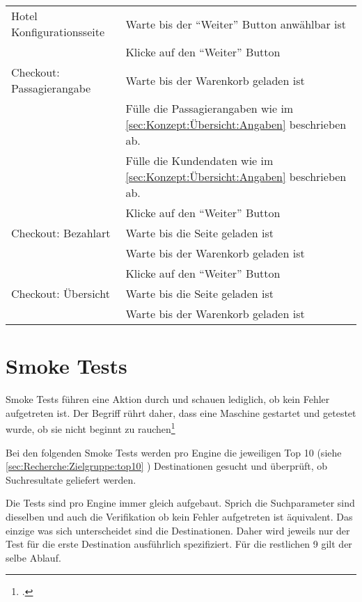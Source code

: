 \begin{table}[H]
\begin{tabularx}{0.9\textwidth}{ | l | X | }
		\multirow{1}{*}{Hotel Konfigurationsseite} & Warte bis der "`Weiter"' Button anwählbar ist \\ \cline{2-2}
		& Klicke auf den "`Weiter"' Button \\ \hline
		
		\multirow{1}{*}{Checkout: Passagierangabe} & Warte bis der Warenkorb geladen ist \\ \cline{2-2}
		& Fülle die Passagierangaben wie im \cref{sec:Konzept:Übersicht:Angaben} \nameref{sec:Konzept:Übersicht:Angaben} beschrieben ab. \\ \cline{2-2}
		& Fülle die Kundendaten wie im \cref{sec:Konzept:Übersicht:Angaben} \nameref{sec:Konzept:Übersicht:Angaben} beschrieben ab. \\ \cline{2-2}
		& Klicke auf den "`Weiter"' Button \\ \hline
		
		\multirow{1}{*}{Checkout: Bezahlart} & Warte bis die Seite geladen ist \\ \cline{2-2}
		& Warte bis der Warenkorb geladen ist \\ \cline{2-2}
		& Klicke auf den "`Weiter"' Button \\ \hline
		
		\multirow{1}{*}{Checkout: Übersicht} & Warte bis die Seite geladen ist \\ \cline{2-2}
		& Warte bis der Warenkorb geladen ist \\ \hline
	\end{tabularx} 
\end{table}

\section{Smoke Tests}
Smoke Tests führen eine Aktion durch und schauen lediglich, ob kein Fehler aufgetreten ist. Der Begriff rührt daher, dass eine Maschine gestartet und getestet wurde, ob sie nicht beginnt zu rauchen\footcite{Smoke_testing_software_-_Wikipedia_the_free_encyclopedia_2015-08-01}

Bei den folgenden Smoke Tests werden pro Engine die jeweiligen Top 10 (siehe \cref{sec:Recherche:Zielgruppe:top10} ) Destinationen gesucht und überprüft, ob Suchresultate geliefert werden.

Die Tests sind pro Engine immer gleich aufgebaut. Sprich die Suchparameter sind dieselben und auch die Verifikation ob kein Fehler aufgetreten ist äquivalent. Das einzige was sich unterscheidet sind die Destinationen. Daher wird jeweils nur der Test für die erste Destination ausführlich spezifiziert. Für die restlichen 9 gilt der selbe Ablauf.

